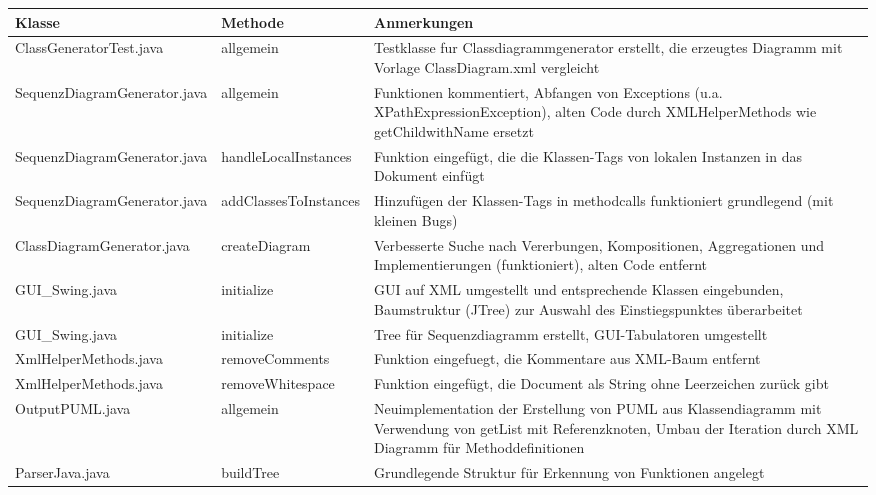 \begin{table}[H]

\begin{tabularx}{\textwidth}{ |l|l|X| }
\hline
\textbf{Klasse} & \textbf{Methode} & \textbf{Anmerkungen}\\
 \hline
ClassGeneratorTest.java & allgemein & Testklasse fur Classdiagrammgenerator erstellt, die erzeugtes Diagramm mit Vorlage ClassDiagram.xml vergleicht\\ \hline
SequenzDiagramGenerator.java & allgemein & Funktionen kommentiert, Abfangen von Exceptions  (u.a. XPathExpressionException), alten Code durch XMLHelperMethods wie getChildwithName ersetzt\\ \hline
SequenzDiagramGenerator.java & handleLocalInstances & Funktion eingefügt, die die Klassen-Tags von lokalen Instanzen in das Dokument einfügt\\ \hline
SequenzDiagramGenerator.java & addClassesToInstances & Hinzufügen der Klassen-Tags in methodcalls funktioniert grundlegend (mit kleinen Bugs)\\ \hline
ClassDiagramGenerator.java & createDiagram & Verbesserte Suche nach Vererbungen, Kompositionen, Aggregationen und Implementierungen (funktioniert), alten Code entfernt\\ \hline
GUI\_Swing.java & initialize & GUI auf XML umgestellt und entsprechende Klassen eingebunden, Baumstruktur (JTree) zur Auswahl des Einstiegspunktes überarbeitet\\ \hline
GUI\_Swing.java & initialize & Tree für Sequenzdiagramm erstellt, GUI-Tabulatoren umgestellt\\ \hline
XmlHelperMethods.java & removeComments & Funktion eingefuegt, die Kommentare aus XML-Baum entfernt\\ \hline
XmlHelperMethods.java & removeWhitespace & Funktion eingefügt, die Document als String ohne Leerzeichen zurück gibt\\ \hline
OutputPUML.java & allgemein & Neuimplementation der Erstellung von PUML aus Klassendiagramm mit Verwendung von getList mit Referenzknoten, Umbau der Iteration durch XML Diagramm für Methoddefinitionen\\ \hline
ParserJava.java & buildTree & Grundlegende Struktur für Erkennung von Funktionen angelegt\\ \hline
 
  
 

\hline
\end{tabularx}
\end{table}

